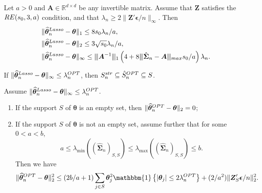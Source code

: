 \documentclass[10pt,a4paper]{amsart}
\newcommand{\bA}{\boldsymbol{A}}
\newcommand{\bZ}{\boldsymbol{Z}}
\newcommand{\bd}[1]{\boldsymbol{#1}}
\newcommand{\bepsilon}{\bd{\epsilon}}
\newcommand{\btheta}{\boldsymbol{\theta}}
\newcommand{\hbSigma}{\hat{\boldsymbol{\Sigma}}}
\newcommand{\hbtheta}{\widehat{\boldsymbol{\theta}}}
\newcommand{\hdS}{\hat{S}^{\textup{OPT}}}
\newcommand{\hdlambda}{\lambda^{\textup{OPT}}}
\newcommand{\idf}{\mathbbm{1}}
\newcommand{\lmax}[1]{\lambda_{\max}\left(#1\right)}
\newcommand{\lmin}[1]{\lambda_{\min}\left(#1\right)}
\newcommand{\ltheta}{\hbtheta^{\textup{Lasso}}}
\newcommand{\mR}{\mathbb{R}}
\newcommand{\mn}{\vert\kern-0.25ex \vert\kern-0.25ex \vert}
\newcommand{\pS}{\hat{S}^{\textup{OPT}}}
\newcommand{\ptheta}{\widehat{\boldsymbol{\theta}}^{\textup{OPT}}}
\begin{document}
\begin{lemma} \label{lemma: bounds of lasso}
Let $a >0$ and $\bA\in \mR^{d\times d}$ be any invertible matrix. Assume that $\bZ$ satisfies the $\textup{RE}(s_0, 3, a)$ condition, and that 
$\lambda_n \ge 2\|\bZ'\bepsilon/n\|_{\infty}$. Then
\begin{align*}
&\|\ltheta_n-\btheta\|_1\le {8s_0\lambda_n}/{a}, \\
&\|\ltheta_n-\btheta\|_2 \le {3\sqrt{s_0}\lambda_n}/{a},\\
& \|\ltheta_n-\btheta\|_{\infty} \le \mn\bA^{-1}\mn_1 \left(4 + 8\mn\hbSigma_n-\bA\mn_{\textup{max}} s_0/a\right)\lambda_n.
\end{align*}
\end{lemma}

\begin{lemma}
\label{lemma: threshold Lasso_ell_infty bound bandit}
If $\|\ltheta_n-\btheta\|_{\infty} \le \hdlambda_n$, then $S_n^{\textup{str}}\subseteq \hdS_n\subseteq S$.
\end{lemma}

\begin{theorem} \label{thm: ols post l2 estimation error}
Assume $\|\ltheta_n-\btheta\|_{\infty}\le \hdlambda_n$.
\begin{enumerate}[label=\roman*)]
    \item If the support $S$ of $\btheta$ is an empty set, then
$\|\ptheta_n-\btheta \|_2 = 0$;
\item If the support $S$ of $\btheta$ is not an empty set, assume further that for some $0< a<b$,
$$a\le \lmin{(\hbSigma_n)_{S,S}} \le \lmax{(\hbSigma_n)_{S,S}} \le b.
$$
Then we have 
$$\|\ptheta_n-\btheta \|_2^2 \le (2b/a+1)\sum_{j\in S} \btheta_j^2 \idf\left\{|\btheta_j| \le 2\hdlambda_n \right\} + (2/a^2)\|\bZ_S'\bepsilon/n\|_2^2.$$
\end{enumerate}
\end{theorem}
\end{document}
